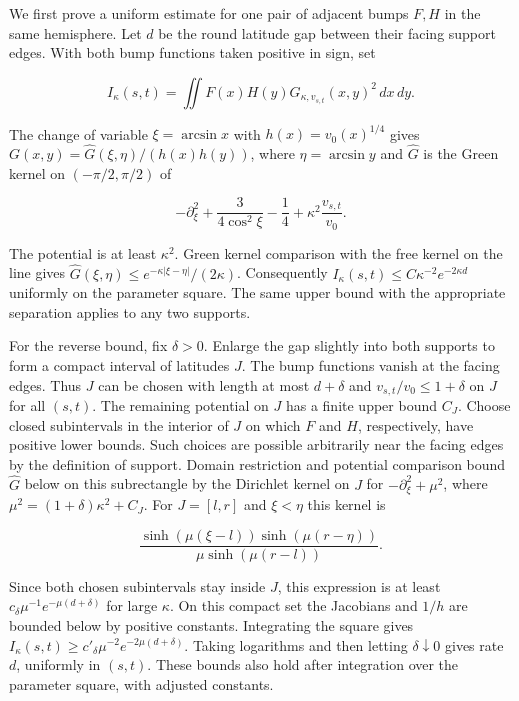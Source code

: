 \documentclass[11pt,letterpaper]{article}
\begin{document}
We first prove a uniform estimate for one pair of adjacent bumps \(F,H\) in the same
hemisphere. Let \(d\) be the round latitude gap between their facing support edges. With
both bump functions taken positive in sign, set

\[I_\kappa(s,t)=\iint F(x)H(y)G_{\kappa,v_{s,t}}(x,y)^2\,dx\,dy.\]

The change of variable \(\xi=\arcsin x\) with \(h(x)=v_0(x)^{1/4}\) gives
\(G(x,y)=\widehat G(\xi,\eta)/(h(x)h(y))\), where \(\eta=\arcsin y\) and \(\widehat G\) is
the Green kernel on \((-\pi/2,\pi/2)\) of

\[-\partial_\xi^2+\frac{3}{4\cos^2\xi}-\frac14+\kappa^2\frac{v_{s,t}}{v_0}.\]

The potential is at least \(\kappa^2\). Green kernel comparison with the free kernel on the
line gives \(\widehat G(\xi,\eta)\le e^{-\kappa|\xi-\eta|}/(2\kappa)\). Consequently
\(I_\kappa(s,t)\le C\kappa^{-2}e^{-2\kappa d}\) uniformly on the parameter square. The same
upper bound with the appropriate separation applies to any two supports.

For the reverse bound, fix \(\delta>0\). Enlarge the gap slightly into both supports to form
a compact interval of latitudes \(J\). The bump functions vanish at the facing edges. Thus
\(J\) can be chosen with length at most \(d+\delta\) and \(v_{s,t}/v_0\le1+\delta\) on \(J\)
for all \((s,t)\). The remaining potential on \(J\) has a finite upper bound \(C_J\). Choose
closed subintervals in the interior of \(J\) on which \(F\) and \(H\), respectively, have
positive lower bounds. Such choices are possible arbitrarily near the facing edges by the
definition of support. Domain restriction and potential comparison bound \(\widehat G\)
below on this subrectangle by the Dirichlet kernel on \(J\) for \(-\partial_\xi^2+\mu^2\),
where \(\mu^2=(1+\delta)\kappa^2+C_J\). For \(J=[l,r]\) and \(\xi<\eta\) this kernel is

\[\frac{\sinh(\mu(\xi-l))\sinh(\mu(r-\eta))}{\mu\sinh(\mu(r-l))}.\]

Since both chosen subintervals stay inside \(J\), this expression is at least
\(c_\delta\mu^{-1}e^{-\mu(d+\delta)}\) for large \(\kappa\). On this compact set the
Jacobians and \(1/h\) are bounded below by positive constants. Integrating the square gives
\(I_\kappa(s,t)\ge c'_\delta\mu^{-2}e^{-2\mu(d+\delta)}\). Taking logarithms and then
letting \(\delta\downarrow0\) gives rate \(d\), uniformly in \((s,t)\). These bounds also
hold after integration over the parameter square, with adjusted constants.
\end{document}
